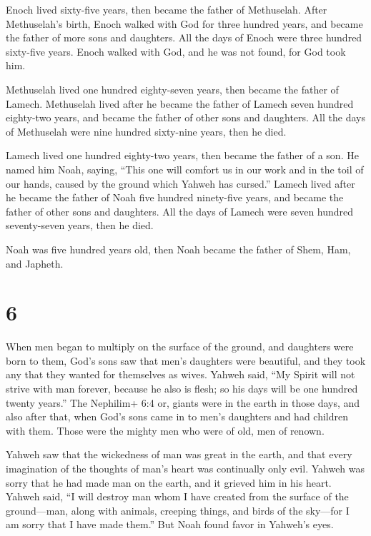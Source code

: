  Enoch lived sixty-five years, then became the father of
Methuselah.  After Methuselah's birth, Enoch walked with
God for three hundred years, and became the father of more sons and
daughters.  All the days of Enoch were three hundred
sixty-five years.  Enoch walked with God, and he was not
found, for God took him.

 Methuselah lived one hundred eighty-seven years, then
became the father of Lamech.  Methuselah lived after he
became the father of Lamech seven hundred eighty-two years, and became
the father of other sons and daughters.  All the days of
Methuselah were nine hundred sixty-nine years, then he died.

 Lamech lived one hundred eighty-two years, then became the
father of a son.  He named him Noah, saying, ``This one
will comfort us in our work and in the toil of our hands, caused by the
ground which Yahweh has cursed.''  Lamech lived after he
became the father of Noah five hundred ninety-five years, and became the
father of other sons and daughters.  All the days of Lamech
were seven hundred seventy-seven years, then he died.

 Noah was five hundred years old, then Noah became the
father of Shem, Ham, and Japheth.

\hypertarget{section-5}{%
\section{6}\label{section-5}}

 When men began to multiply on the surface of the ground,
and daughters were born to them,  God's sons saw that men's
daughters were beautiful, and they took any that they wanted for
themselves as wives.  Yahweh said, ``My Spirit will not
strive with man forever, because he also is flesh; so his days will be
one hundred twenty years.''  The Nephilim+ 6:4 or, giants
were in the earth in those days, and also after that, when God's sons
came in to men's daughters and had children with them. Those were the
mighty men who were of old, men of renown.

 Yahweh saw that the wickedness of man was great in the
earth, and that every imagination of the thoughts of man's heart was
continually only evil.  Yahweh was sorry that he had made
man on the earth, and it grieved him in his heart.  Yahweh
said, ``I will destroy man whom I have created from the surface of the
ground---man, along with animals, creeping things, and birds of the
sky---for I am sorry that I have made them.''  But Noah
found favor in Yahweh's eyes.

